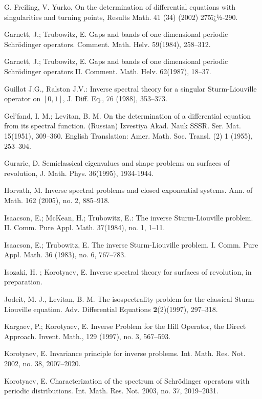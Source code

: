 \documentclass[10pt]{amsart}
\begin{document}
\begin{thebibliography}
 G. Freiling, V. Yurko, On the determination of differential equations with singularities and turning points, Results Math. 41 (34) (2002) 275ï¿½-290.

 Garnett, J.; Trubowitz,  E. Gaps and bands of one dimensional
 periodic Schr\"odinger operators. Comment. Math. Helv. 59(1984), 258--312.

 Garnett, J.; Trubowitz, E. Gaps and bands of one dimensional
periodic Schr\"odinger operators II. Comment. Math. Helv. 62(1987), 18--37.

 Guillot J.G., Ralston J.V.: Inverse spectral theory for a
singular Sturm-Liouville operator on $[0,1]$, J. Diff. Eq., 76 (1988), 353--373.

 Gel'fand, I. M.; Levitan, B. M. On the determination
of a differential equation from its spectral function. (Russian) Izvestiya Akad. Nauk SSSR. Ser. Mat. 15(1951), 309--360. English Translation:
Amer. Math. Soc. Transl. (2) 1 (1955), 253--304.

 Gurarie,  D. Semiclassical eigenvalues and shape
 problems on surfaces of revolution, J. Math. Phys. 36(1995), 1934-1944.

 Horvath, M. Inverse spectral problems and closed exponential systems. Ann. of Math. 162 (2005), no. 2, 885--918.

 Isaacson, E.; McKean, H.; Trubowitz, E.:
The inverse Sturm-Liouville problem. II. Comm. Pure Appl. Math. 37(1984), no. 1, 1--11.

 Isaacson, E.; Trubowitz, E.
The inverse Sturm-Liouville problem. I. Comm. Pure Appl. Math. 36 (1983), no. 6,
   767--783.

 Isozaki, H. ;  Korotyaev, E.
Inverse spectral theory for surfaces of revolution, in preparation.

 Jodeit, M. J., Levitan, B. M. The isospectrality problem for the classical
Sturm-Liouville equation. Adv. Differential Equations {\bf 2}(2)(1997), 297--318.

 Kargaev, P.;  Korotyaev, E. Inverse Problem for the Hill
Operator, the Direct Approach.  Invent. Math., 129 (1997), no. 3, 567--593.

   Korotyaev, E. Invariance principle for inverse problems. Int.
Math. Res. Not. 2002, no. 38, 2007--2020.

  Korotyaev, E. Characterization of the spectrum of
 Schr\"odinger operators with periodic distributions.
 Int. Math. Res. Not. 2003, no. 37, 2019--2031.


\end{thebibliography}
\end{document}
